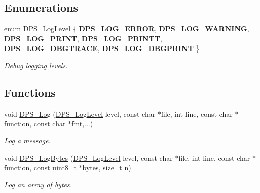 \subsection*{Enumerations}
\begin{DoxyCompactItemize}
\item 
\mbox{\label{group__debug_gad06c0421a8226b0a95be1d722ca05612}} 
enum \hyperlink{group__debug_gad06c0421a8226b0a95be1d722ca05612}{D\+P\+S\+\_\+\+Log\+Level} \{ \newline
{\bfseries D\+P\+S\+\_\+\+L\+O\+G\+\_\+\+E\+R\+R\+OR}, 
{\bfseries D\+P\+S\+\_\+\+L\+O\+G\+\_\+\+W\+A\+R\+N\+I\+NG}, 
{\bfseries D\+P\+S\+\_\+\+L\+O\+G\+\_\+\+P\+R\+I\+NT}, 
{\bfseries D\+P\+S\+\_\+\+L\+O\+G\+\_\+\+P\+R\+I\+N\+TT}, 
\newline
{\bfseries D\+P\+S\+\_\+\+L\+O\+G\+\_\+\+D\+B\+G\+T\+R\+A\+CE}, 
{\bfseries D\+P\+S\+\_\+\+L\+O\+G\+\_\+\+D\+B\+G\+P\+R\+I\+NT}
 \}\begin{DoxyCompactList}\small\item\em Debug logging levels. \end{DoxyCompactList}
\end{DoxyCompactItemize}
\subsection*{Functions}
\begin{DoxyCompactItemize}
\item 
void \hyperlink{group__debug_ga174fef61dca16376546e570c9b831502}{D\+P\+S\+\_\+\+Log} (\hyperlink{group__debug_gad06c0421a8226b0a95be1d722ca05612}{D\+P\+S\+\_\+\+Log\+Level} level, const char $\ast$file, int line, const char $\ast$function, const char $\ast$fmt,...)
\begin{DoxyCompactList}\small\item\em Log a message. \end{DoxyCompactList}\item 
void \hyperlink{group__debug_ga7cc66c1e82ef557238c122b067f5337a}{D\+P\+S\+\_\+\+Log\+Bytes} (\hyperlink{group__debug_gad06c0421a8226b0a95be1d722ca05612}{D\+P\+S\+\_\+\+Log\+Level} level, const char $\ast$file, int line, const char $\ast$function, const uint8\+\_\+t $\ast$bytes, size\+\_\+t n)
\begin{DoxyCompactList}\small\item\em Log an array of bytes. \end{DoxyCompactList}\end{DoxyCompactItemize}
